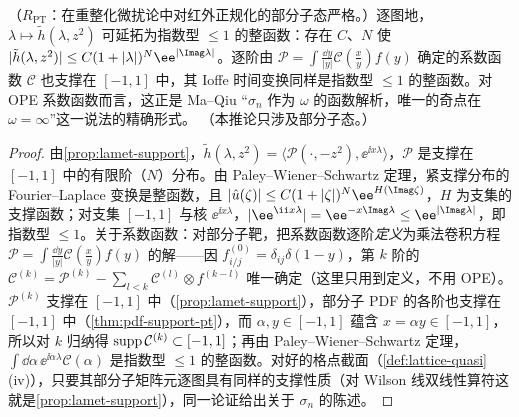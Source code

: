 \begin{corollary}\label{cor:lamet-entire}
（$R_{\mathrm{PT}}$：在重整化微扰论中对红外正规化的部分子态严格。）逐图地，$\lambda\mapsto\tilde h(\lambda,z^2)$ 可延拓为指数型 $\le1$ 的整函数：存在 $C$、$N$ 使 $|\tilde h(\lambda,z^2)|\le C(1+|\lambda|)^N\ee^{|\Imag\lambda|}$。逐阶由 $\mathcal P=\int\frac{\dd y}{|y|}\mathcal C(\frac xy)f(y)$ 确定的系数函数 $\mathcal C$ 也支撑在 $[-1,1]$ 中，其 Ioffe 时间变换同样是指数型 $\le1$ 的整函数。对 OPE 系数函数而言，这正是 Ma--Qiu “$\sigma_n$ 作为 $\omega$ 的函数解析，唯一的奇点在 $\omega=\infty$”\cite{MaQiu2018}这一说法的精确形式。
（本推论只涉及部分子态。）
\end{corollary}

\begin{proof}
由\cref{prop:lamet-support}，$\tilde h(\lambda,z^2)=\langle\mathcal P(\cdot,-z^2),\ee^{\ii x\lambda}\rangle$，$\mathcal P$ 是支撑在 $[-1,1]$ 中的有限阶（$N$）分布。由 Paley--Wiener--Schwartz 定理\cite[定理~7.3.1]{Hormander2003}，紧支撑分布的 Fourier--Laplace 变换是整函数，且 $|\hat u(\zeta)|\le C(1+|\zeta|)^N\ee^{H(\Imag\zeta)}$，$H$ 为支集的支撑函数；对支集 $[-1,1]$ 与核 $\ee^{\ii x\lambda}$，$|\ee^{\ii x\lambda}|=\ee^{-x\Imag\lambda}\le\ee^{|\Imag\lambda|}$，即指数型 $\le1$。关于系数函数：对部分子靶，把系数函数逐阶\emph{定义}为乘法卷积方程 $\mathcal P=\int\frac{\dd y}{|y|}\mathcal C(\frac xy)f(y)$ 的解——因 $f^{(0)}_{i/j}=\delta_{ij}\delta(1-y)$，第 $k$ 阶的 $\mathcal C^{(k)}=\mathcal P^{(k)}-\sum_{l<k}\mathcal C^{(l)}\otimes f^{(k-l)}$ 唯一确定（这里只用到定义，不用 OPE）。$\mathcal P^{(k)}$ 支撑在 $[-1,1]$ 中（\cref{prop:lamet-support}），部分子 PDF 的各阶也支撑在 $[-1,1]$ 中（\cref{thm:pdf-support-pt}），而 $\alpha,y\in[-1,1]$ 蕴含 $x=\alpha y\in[-1,1]$，所以对 $k$ 归纳得 ${\rm supp}\,\mathcal C^{(k)}\subset[-1,1]$；再由 Paley--Wiener--Schwartz 定理，$\int\dd\alpha\,\ee^{\ii\alpha\lambda}\mathcal C(\alpha)$ 是指数型 $\le1$ 的整函数。对好的格点截面（\cref{def:lattice-quasi}(iv)），只要其部分子矩阵元逐图具有同样的支撑性质（对 Wilson 线双线性算符这就是\cref{prop:lamet-support}），同一论证给出关于 $\sigma_n$ 的陈述。
\end{proof}

